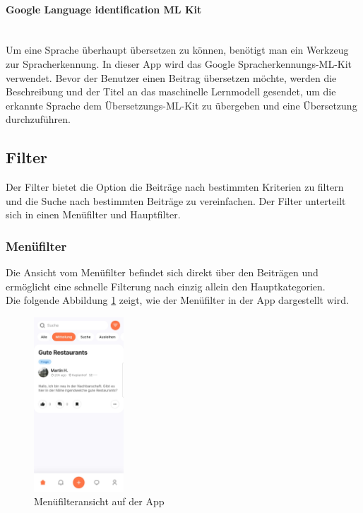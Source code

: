 \paragraph{Google Language identification ML Kit}\mbox{} \\

Um eine Sprache überhaupt übersetzen zu können, benötigt man ein Werkzeug zur Spracherkennung. In dieser App wird das Google Spracherkennungs-ML-Kit verwendet. Bevor der Benutzer einen Beitrag übersetzen möchte, werden die Beschreibung und der Titel an das maschinelle Lernmodell gesendet, um die erkannte Sprache dem Übersetzungs-ML-Kit zu übergeben und eine Übersetzung durchzuführen.


\subsection{Filter}
Der Filter bietet die Option die Beiträge nach bestimmten Kriterien zu filtern und die Suche nach bestimmten Beiträge zu vereinfachen. Der Filter unterteilt sich in einen Menüfilter und Hauptfilter.

\subsubsection{Menüfilter}

Die Ansicht vom Menüfilter befindet sich direkt über den Beiträgen und ermöglicht eine schnelle Filterung nach einzig allein den Hauptkategorien.
\\
Die folgende Abbildung \ref{fig:menu-filter} zeigt, wie der Menüfilter in der App dargestellt wird.

\begin{figure}[h]
  \centering
  \includegraphics[width=0.3\textwidth]{pics/menu-filter.jpg}
  \caption{Menüfilteransicht auf der App}
  \label{fig:menu-filter}
\end{figure}

